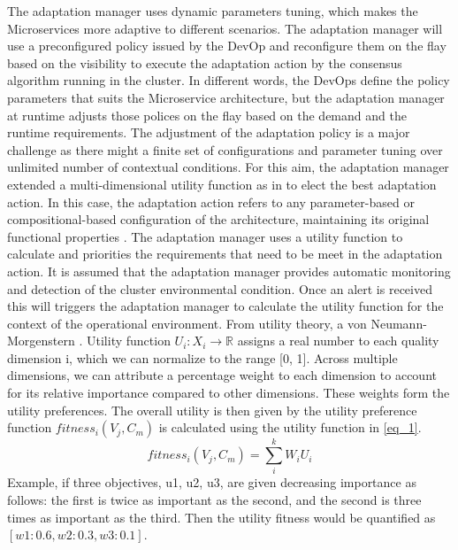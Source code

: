 \documentclass[sigconf]{acmart}
\begin{document}
The adaptation manager uses dynamic parameters tuning, which makes the Microservices more adaptive to different scenarios. The adaptation manager will use a preconfigured policy issued by the DevOp and reconfigure them on the flay based on the visibility to execute the adaptation action by the consensus algorithm running in the cluster. In different words, the DevOps define the policy parameters that suits the Microservice architecture, but the adaptation manager at runtime adjusts those polices on the flay based on the demand and the runtime requirements. The adjustment of the adaptation policy is a major challenge as there might a finite set of configurations and parameter tuning over unlimited number of contextual conditions. For this aim, the adaptation manager extended a multi-dimensional utility function as in \cite{KonstantinosKakousis:2008ub} to elect the best adaptation action. In this case, the adaptation action refers to any parameter-based or compositional-based configuration of the architecture, maintaining its original functional properties \cite{KonstantinosKakousis:2008ub}. The adaptation manager uses a utility function to calculate and priorities the requirements that need to be meet in the adaptation action. It is assumed that the adaptation manager provides automatic monitoring and detection of the cluster environmental condition. Once an alert is received this will triggers the adaptation manager to calculate the utility function for the context of the operational environment. 
From utility theory, a von Neumann-Morgenstern \cite{fishburn1979two}. Utility function  $U_{i} : X_{i} \rightarrow \mathbb{R}$ 
assigns a real number to each quality dimension i, which we can normalize to the range [0, 1]. Across multiple dimensions, we can attribute a percentage weight to each dimension to account for its relative importance compared to other dimensions. These weights form the utility preferences. The overall utility is then given by the utility preference function $ fitness_{i}(V_{j},C_{m}) $ is calculated using the utility function in \ref{eq_1}. 
\begin{equation}
\label{eq_1}
fitness_{i}(V_{j},C_{m}) = \sum_{i}^{k} W_{i} U_{i}
\end{equation}
Example, if three objectives, u1, u2, u3, are given decreasing importance as follows: the first is twice as important as the second, and the second is three times as important as the third. Then the utility fitness would be quantified as $[w1 : 0.6, w2 : 0.3, w3 : 0.1]$. 
\end{document}
